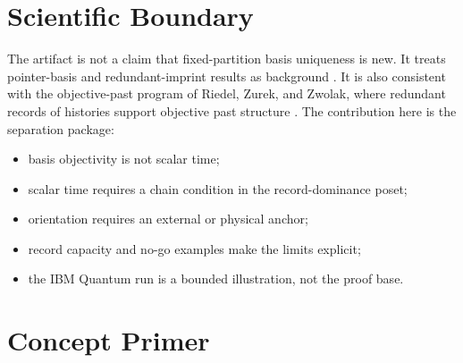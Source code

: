 \documentclass[11pt]{article}
\begin{document}
\section{Scientific Boundary}

The artifact is not a claim that fixed-partition basis uniqueness is new.  It
treats pointer-basis and redundant-imprint results as background
\cite{Zurek1981,Fu2021}.  It is also consistent with the objective-past program
of Riedel, Zurek, and Zwolak, where redundant records of histories support
objective past structure \cite{RiedelZurekZwolak2016}.  The contribution here is
the separation package:
\begin{itemize}
  \item basis objectivity is not scalar time;
  \item scalar time requires a chain condition in the record-dominance poset;
  \item orientation requires an external or physical anchor;
  \item record capacity and no-go examples make the limits explicit;
  \item the IBM Quantum run is a bounded illustration, not the proof base.
\end{itemize}

\section{Concept Primer}
\end{document}
